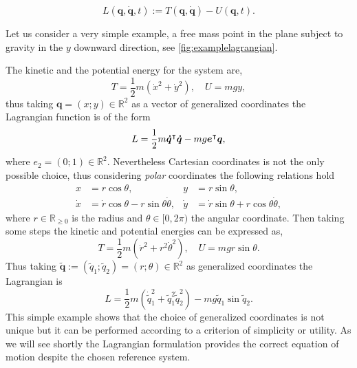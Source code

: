 		\begin{equation}
			\label{eq:lagrangianfunction}
			L(\bm{q},\dot{\bm{q}},t) := T(\bm{q},\dot{\bm{q}}) - U(\bm{q},t).
		\end{equation}
		\begin{example}
			\label{ex:nonuniquessofq}
			Let us consider a very simple example, a free mass point in the plane subject to gravity in the $y$ downward direction, see \cref{fig:examplelagrangian}.
			
			The kinetic and the potential energy for the system are, 
			\begin{equation*}
				T = \frac{1}{2}m(\dot{x}^{2}+\dot{y}^{2}), \quad U = mgy,
			\end{equation*}
			thus taking $\bm{q} = (x;y)\in\mathbb{R}^{2}$ as a vector of generalized coordinates the Lagrangian function is of the form 
			\begin{equation*}
				L = \frac{1}{2}m\bm{\dot{q}}^{\intercal}\bm{\dot{q}} - mg\bm{e}^{\intercal}\bm{q},
			\end{equation*}
			where $e_{2}=(0;1)\in\mathbb{R}^{2}$. Nevertheless Cartesian coordinates is not the only possible choice, thus considering \emph{polar} coordinates the following relations hold
			\begin{subequations}
				\begin{align*}
					x &= r\cos{\theta}, & y &= r\sin{\theta}, \\
					\dot{x} &= \dot{r}\cos{\theta} - r\sin{\theta}\dot{\theta}, & \dot{y} &= \dot{r}\sin{\theta}+r\cos{\theta}\dot{\theta},
				\end{align*}
			\end{subequations}
			where $r\in\mathbb{R}_{\geq 0}$ is the radius and $\theta\in[0,2\pi)$ the angular coordinate. Then taking some steps the kinetic and potential energies can be expressed as, 
			\begin{equation*}
				T = \frac{1}{2}m(\dot{r}^{2}+r^{2}\dot{\theta}^{2}), \quad U = mgr\sin{\theta}.
			\end{equation*}
			Thus taking $\widetilde{\bm{q}}:=(\widetilde{q}_{1};\widetilde{q}_{2})=(r;\theta)\in\mathbb{R}^{2}$ as generalized coordinates the Lagrangian is
			\begin{equation}
				L = \frac{1}{2}m(\dot{\widetilde{q}}_{1}^{2}+\widetilde{q}_{1}^{2}\dot{\widetilde{q}}_{2}^{2}) - mg\widetilde{q}_{1}\sin{\widetilde{q}_{2}}.
			\end{equation}
			This simple example shows that the choice of generalized coordinates is not unique but it can be performed according to a criterion of simplicity or utility. As we will see shortly the Lagrangian formulation provides the correct equation of motion despite the chosen reference system. 
		\end{example}
